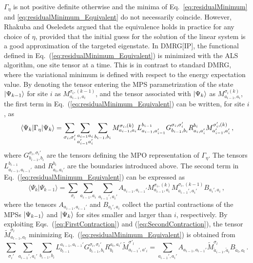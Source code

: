 \documentclass[journal=jctcce]{achemso}
\begin{document}
$\Gamma_\eta$ is not positive definite otherwise and the minima of Eq.~\eqref{eq:residualMinimum} and \eqref{eq:residualMinimum_Equivalent} do not necessarily coincide.
However, Rhakuba and Oseledets argued\cite{Oseledts2016} that the equivalence holds in practice for any choice of $\eta$, provided that the initial guess for the solution of the linear system is a good approximation of the targeted eigenstate.
In DMRG[IP], the functional defined in Eq.~(\ref{eq:residualMinimum_Equivalent}) is minimized with the ALS algorithm, one site tensor at a time. This is in contrast to standard DMRG, where the variational minimum is defined with respect to the energy expectation value.\cite{Schollwoeck2011_Review-DMRG}
By denoting the tensor entering the MPS parametrization of the state $\ket{\Psi_{k-1}}$ for site $i$ as $M_{a_{i-1},a_i}^{\sigma_i,(k-1)}$, and the tensor associated with $\ket{\Psi_{k}}$ as $M_{a_{i-1},a_i}^{\sigma_i(k)}$, the first term in Eq.~(\ref{eq:residualMinimum_Equivalent}) can be written, for site $i$, as
\begin{equation}
  \mel{\Psi_{k}}{\Gamma_\eta}{\Psi_{k}} 
    = \sum_{\sigma_i, \sigma_i'} \sum_{\substack{a_{i-1} a_i \\ a_{i-1}' a_i'}} \sum_{b_{i-1},b_i}
      M_{a_{i-1}, a_i}^{\sigma_i,(k)} L_{a_{i-1},a'_{i-1}}^{b_{i-1}} G^{\sigma_i, \sigma_i'}_{b_{i-1}, b_i} 
      R_{a_i, a_i'}^{b_i} M_{a_{i-1}', a_i'}^{\sigma_i',(k)} \, ,
  \label{eq:FirstContraction}
\end{equation}
%
where $G^{\sigma_i, \sigma_i'}_{b_{i-1}, b_i}$ are the tensors defining the MPO representation of $\Gamma_\eta$.
The tensors $L_{a_{i-1},a_{i-1}'}^{b_{i-1}}$ and $R_{a_i, a_i'}^{b_i}$ are the boundaries\cite{Schollwoeck2011_Review-DMRG,Keller2015_MPS-MPO-SQHamiltonian} introduced above.
The second term in Eq.~(\ref{eq:residualMinimum_Equivalent}) can be expressed as
%
\begin{equation}
  \langle \Psi_{k} | \Psi_{k-1} \rangle = \sum_{\sigma_i} \sum_{a_{i-1}, a_i} \sum_{a_{i-1}', a_i'} 
     A_{a_{i-1},a_{i-1}'} M_{a_{i-1},a_i}^{\sigma_i,(k)} M_{a_{i-1}',a_i'}^{\sigma_i,(k-1)} B_{a_i',a_i} \, ,
  \label{eq:SecondContraction}
\end{equation}
%
where the tensors $A_{a_{i-1},a_{i-1}'}$ and $B_{a_i',a_i}$ collect the partial contractions of the MPSs $\ket{\Psi_{k-1}}$ and $\ket{\Psi_{k}}$ for sites smaller and larger than $i$, respectively.
By exploiting Eqs.~(\ref{eq:FirstContraction}) and (\ref{eq:SecondContraction}), 
the tensor $\tilde{M}_{a_{l-1},a_l}^{\sigma_l}$ minimizing Eq.~(\ref{eq:residualMinimum_Equivalent}) is obtained from
%
\begin{equation}
  \sum_{\sigma_i'} \sum_{a_{i-1}', a_i'} \sum_{b_{i-1},b_i} 
    L^{a_{i-1},a_{i-1}'}_{b_{i-1}} G^{\sigma_i, \sigma_i'}_{b_{i-1}, b_i} R_{b_i}^{a_i, a_i'}
    \tilde{M}_{a_{i-1}', a'_i}^{\sigma'_l} 
  = \sum_{a_{i-1}',a_i'} A_{a_{i-1},a_{i-1}'} \tilde{M}^{\sigma_l}_{\tilde{a}_{i-1},\tilde{a}_i} 
                         B_{ \tilde{a}_l, a_l} \, .
  \label{eq:ContractedLinearSystem}
\end{equation}
\end{document}
